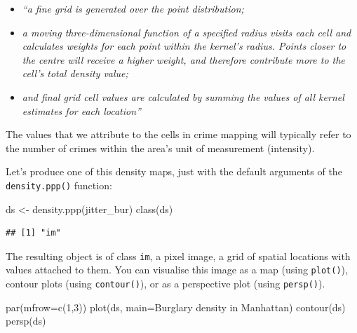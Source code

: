 \documentclass[
  krantz2]{krantz}
\makeatletter
\newenvironment{Shaded}{\begin{snugshade}}{\end{snugshade}}
\newcommand{\AttributeTok}[1]{\textcolor[rgb]{0.61,0.61,0.61}{#1}}
\newcommand{\DecValTok}[1]{\textcolor[rgb]{0.06,0.06,0.06}{#1}}
\newcommand{\FunctionTok}[1]{\textcolor[rgb]{0,0,0}{#1}}
\newcommand{\NormalTok}[1]{#1}
\newcommand{\OtherTok}[1]{\textcolor[rgb]{0.37,0.37,0.37}{#1}}
\newcommand{\StringTok}[1]{\textcolor[rgb]{0.5,0.5,0.5}{#1}}
\providecommand{\tightlist}{%
  \setlength{\itemsep}{0pt}\setlength{\parskip}{0pt}}
\newenvironment{kframe}{%
\medskip{}
\setlength{\fboxsep}{.8em}
 \def\at@end@of@kframe{}%
 \ifinner\ifhmode%
  \def\at@end@of@kframe{\end{minipage}}%
  \begin{minipage}{\columnwidth}%
 \fi\fi%
 \def\FrameCommand##1{\hskip\@totalleftmargin \hskip-\fboxsep
 \colorbox{shadecolor}{##1}\hskip-\fboxsep
     \hskip-\linewidth \hskip-\@totalleftmargin \hskip\columnwidth}%
 \MakeFramed {\advance\hsize-\width
   \@totalleftmargin\z@ \linewidth\hsize
   \@setminipage}}%
 {\par\unskip\endMakeFramed%
 \at@end@of@kframe}
\renewenvironment{Shaded}{\begin{kframe}}{\end{kframe}}
\makeatother
\begin{document}
\begin{itemize}
\tightlist
\item
  \emph{``a fine grid is generated over the point distribution;}
\item
  \emph{a moving three-dimensional function of a specified radius visits each cell and calculates weights for each point within the kernel's radius. Points closer to the centre will receive a higher weight, and therefore contribute more to the cell's total density value;}
\item
  \emph{and final grid cell values are calculated by summing the values of all kernel estimates for each location''}
\end{itemize}

The values that we attribute to the cells in crime mapping will typically refer to the number of crimes within the area's unit of measurement (intensity).

Let's produce one of this density maps, just with the default arguments of the \texttt{density.ppp()} function:

\begin{Shaded}
\begin{Highlighting}[]
\NormalTok{ds }\OtherTok{\textless{}{-}} \FunctionTok{density.ppp}\NormalTok{(jitter\_bur)}
\FunctionTok{class}\NormalTok{(ds)}
\end{Highlighting}
\end{Shaded}

\begin{verbatim}
## [1] "im"
\end{verbatim}

The resulting object is of class \texttt{im}, a pixel image, a grid of spatial locations with values attached to them. You can visualise this image as a map (using \texttt{plot()}), contour plots (using \texttt{contour()}), or as a perspective plot (using \texttt{persp()}).

\begin{Shaded}
\begin{Highlighting}[]
\FunctionTok{par}\NormalTok{(}\AttributeTok{mfrow=}\FunctionTok{c}\NormalTok{(}\DecValTok{1}\NormalTok{,}\DecValTok{3}\NormalTok{))}
\FunctionTok{plot}\NormalTok{(ds, }\AttributeTok{main=}\StringTok{\textquotesingle{}Burglary density in Manhattan\textquotesingle{}}\NormalTok{)}
\FunctionTok{contour}\NormalTok{(ds)}
\FunctionTok{persp}\NormalTok{(ds)}
\end{Highlighting}
\end{Shaded}
\end{document}
